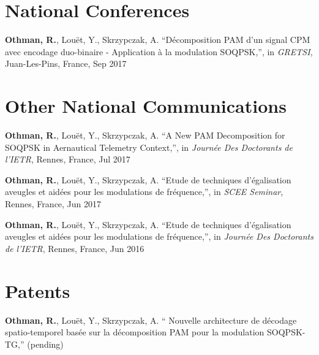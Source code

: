 \section*{National Conferences}
\renewcommand{\labelenumi}{[NC-\arabic{enumi}]}
\begin{etaremune}
\item \textbf{Othman, R.}, Lou\"{e}t, Y., Skrzypczak, A. ``D\'{e}composition PAM d'un signal CPM avec encodage duo-binaire - Application \`{a} la modulation SOQPSK,'', in \emph{GRETSI}, Juan-Les-Pins, France, Sep 2017 
\end{etaremune}

\section*{Other National Communications}
\renewcommand{\labelenumi}{[ONC-\arabic{enumi}]}
\begin{etaremune}
\item	\textbf{Othman, R.}, Lou\"{e}t, Y., Skrzypczak, A. ``A New PAM Decomposition for SOQPSK in Aernautical Telemetry Context,'', in \emph{Journ\'{e}e Des Doctorants de l'IETR}, Rennes, France, Jul 2017 
\item	\textbf{Othman, R.}, Lou\"{e}t, Y., Skrzypczak, A. ``Etude de techniques d’\'{e}galisation aveugles et aid\'{e}es pour les modulations de fr\'{e}quence,'', in \emph{SCEE Seminar}, Rennes, France, Jun 2017 
\item	\textbf{Othman, R.}, Lou\"{e}t, Y., Skrzypczak, A. ``Etude de techniques d’\'{e}galisation aveugles et aid\'{e}es pour les modulations de fr\'{e}quence,'', in \emph{Journ\'{e}e Des Doctorants de l'IETR}, Rennes, France, Jun 2016 	
\end{etaremune}

\section*{Patents}
\renewcommand{\labelenumi}{[PT-\arabic{enumi}]}
\begin{etaremune}
\item \textbf{Othman, R.}, Lou\"{e}t, Y., Skrzypczak, A. `` Nouvelle architecture de d\'{e}codage spatio-temporel bas\'{e}e sur la d\'{e}composition PAM pour la modulation SOQPSK-TG,'' (pending)
\end{etaremune}
